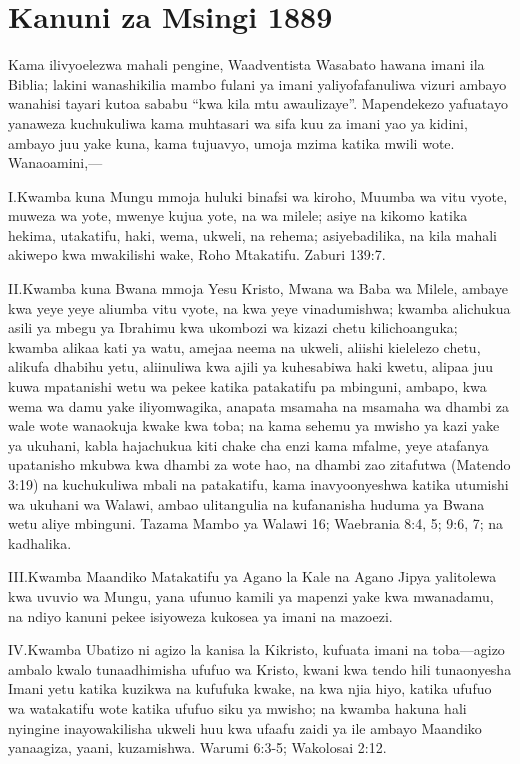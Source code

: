  \label{chap:appendix}


\section*{Kanuni za Msingi 1889}

Kama ilivyoelezwa mahali pengine, Waadventista Wasabato hawana imani ila Biblia; lakini wanashikilia mambo fulani ya imani yaliyofafanuliwa vizuri ambayo wanahisi tayari kutoa sababu “kwa kila mtu awaulizaye”. Mapendekezo yafuatayo yanaweza kuchukuliwa kama muhtasari wa sifa kuu za imani yao ya kidini, ambayo juu yake kuna, kama tujuavyo, umoja mzima katika mwili wote. Wanaoamini,—

\lettrine{I.} Kwamba kuna Mungu mmoja huluki binafsi wa kiroho, Muumba wa vitu vyote, muweza wa yote, mwenye kujua yote, na wa milele; asiye na kikomo katika hekima, utakatifu, haki, wema, ukweli, na rehema; asiyebadilika, na kila mahali akiwepo kwa mwakilishi wake, Roho Mtakatifu. Zaburi 139:7.

\lettrine{II.} Kwamba kuna Bwana mmoja Yesu Kristo, Mwana wa Baba wa Milele, ambaye kwa yeye yeye aliumba vitu vyote, na kwa yeye vinadumishwa; kwamba alichukua asili ya mbegu ya Ibrahimu kwa ukombozi wa kizazi chetu kilichoanguka; kwamba alikaa kati ya watu, amejaa neema na ukweli, aliishi kielelezo chetu, alikufa dhabihu yetu, aliinuliwa kwa ajili ya kuhesabiwa haki kwetu, alipaa juu kuwa mpatanishi wetu wa pekee katika patakatifu pa mbinguni, ambapo, kwa wema wa damu yake iliyomwagika, anapata msamaha na msamaha wa dhambi za wale wote wanaokuja kwake kwa toba; na kama sehemu ya mwisho ya kazi yake ya ukuhani, kabla hajachukua kiti chake cha enzi kama mfalme, yeye atafanya upatanisho mkubwa kwa dhambi za wote hao, na dhambi zao zitafutwa (Matendo 3:19) na kuchukuliwa mbali na patakatifu, kama inavyoonyeshwa katika utumishi wa ukuhani wa Walawi, ambao ulitangulia na kufananisha huduma ya Bwana wetu aliye mbinguni. Tazama Mambo ya Walawi 16; Waebrania 8:4, 5; 9:6, 7; na kadhalika.

\lettrine{III.} Kwamba Maandiko Matakatifu ya Agano la Kale na Agano Jipya yalitolewa kwa uvuvio wa Mungu, yana ufunuo kamili ya mapenzi yake kwa mwanadamu, na ndiyo kanuni pekee isiyoweza kukosea ya imani na mazoezi.

\lettrine{IV.} Kwamba Ubatizo ni agizo la kanisa la Kikristo, kufuata imani na toba—agizo ambalo kwalo tunaadhimisha ufufuo wa Kristo, kwani kwa tendo hili tunaonyesha Imani yetu katika kuzikwa na kufufuka kwake, na kwa njia hiyo, katika ufufuo wa watakatifu wote katika ufufuo siku ya mwisho; na kwamba hakuna hali nyingine inayowakilisha ukweli huu kwa ufaafu zaidi ya ile ambayo Maandiko yanaagiza, yaani, kuzamishwa. Warumi 6:3-5; Wakolosai 2:12.

